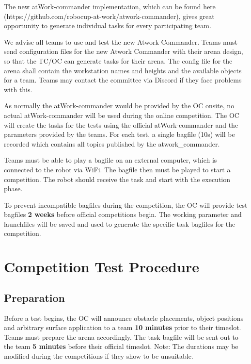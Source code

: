 The new atWork-commander implementation, which can be found here (https://github.com/robocup-at-work/atwork-commander), 
gives great opportunity to generate individual tasks for every participating team.

We advise all teams to use and test the new Atwork Commander. Teams must send configuration files for the new Atwork Commander with their arena design, so that the TC/OC can generate tasks for their arena. The config file for the arena shall contain the workstation names and heights and the available objects for a team. Teams may contact the committee via Discord if they face problems with this.  

As normally the atWork-commander would be provided by the OC onsite, no actual atWork-commander will be used during the online competition.
The OC will create the tasks for the tests using the official atWork-commander and the parameters provided by the teams. 
For each test, a single bagfile (10s) will be recorded which contains all topics published by the atwork\_commander.

Teams must be able to play a bagfile on an external computer, which is connected to the robot via WiFi.
The bagfile then must be played to start a competition. The robot should receive the task and start with the execution phase.

To prevent incompatible bagfiles during the competition, 
the OC will provide test bagfiles \textbf{2 weeks} before official competitions begin.
The working parameter and launchfiles will be saved and used to generate the specific task bagfiles for the competition.

\section{Competition Test Procedure} 
\label{sec:VRCTestExec}

\subsection{Preparation} 

Before a test begins, the OC will announce obstacle placements, object positions and arbitrary surface application to a team \textbf{10 minutes} prior to their timeslot. Teams must prepare the arena accordingly. The task bagfile will be sent out to the team \textbf{5 minutes} before their official timeslot. Note: The durations may be modified during the competitions if they show to be unsuitable.

